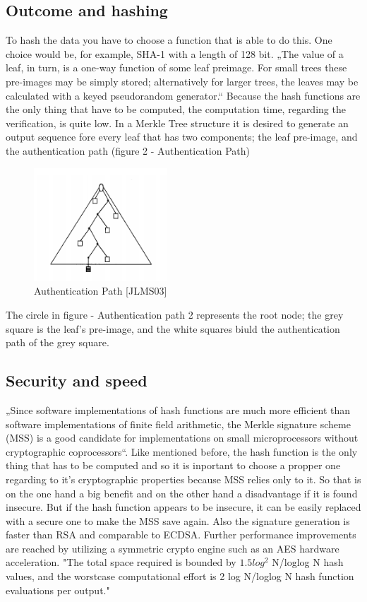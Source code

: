 \subsection{Outcome and hashing}
To hash the data you have to choose a function that is able to do this. One choice would be, for example, SHA-1 with a length of 128 bit.
„The value of a leaf, in turn, is a one-way function of some leaf preimage. For small trees these pre-images may be simply stored; alternatively for larger trees, the leaves may be calculated with a keyed pseudorandom generator.“ \cite{MT} Because the hash functions are the only thing that have to be computed, the computation time, regarding the verification, is quite low. \cite{METR} In a Merkle Tree structure it is desired to generate an output sequence fore every leaf that has two components; the leaf pre-image, and the authentication path (figure 2 - Authentication Path) \cite{MT}

\begin{figure}
\centering
\includegraphics[width=5cm]{Pages/Merkle/API.png}
\caption{Authentication Path [JLMS03]}
\end{figure}

The circle in figure - Authentication path 2 represents the root node; the grey square is the leaf’s pre-image, and the white squares biuld the authentication path of the grey square.

\subsection{Security and speed}
„Since software implementations of hash functions are much more efficient than software implementations of finite field arithmetic, the Merkle signature scheme (MSS) is a good candidate for implementations on small microprocessors without cryptographic coprocessors“. \cite{FHB} Like mentioned before, the hash function is the only thing that has to be computed and so it is inportant to choose a propper one regarding to it’s cryptographic properties because MSS relies only to it. So that is on the one hand a big benefit and on the other hand a disadvantage if it is found insecure. But if the hash function appears to be insecure, it can be easily replaced with a secure one to make the MSS save again. Also the signature generation is faster than RSA and comparable to ECDSA. Further performance improvements are reached by utilizing a symmetric crypto engine such as an AES hardware acceleration. \cite{FHB}  "The total space
required is bounded by $ 1.5 log^2 $  N/loglog N hash values, and the worstcase computational effort is 2 log N/loglog N hash function evaluations
per output." \cite{MT}

